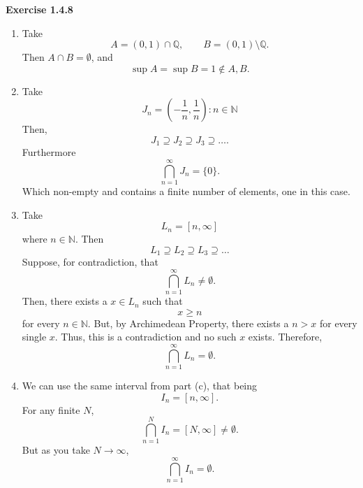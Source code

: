 \documentclass[12pt]{article}
\begin{document}
\noindent{} \textbf{Exercise 1.4.8}
\begin{enumerate}
    \item [(a)] Take
          \[
              A = (0,1) \cap \mathbb{Q}, \qquad B = (0,1) \setminus \mathbb{Q}.
          \]
          Then $A \cap B = \emptyset$, and
          \[
              \sup A = \sup B = 1 \notin A, B.
          \]
    \item [(b)] Take
          \[
              J_n = \left(-\frac{1}{n}, \frac{1}{n}\right) : n \in \mathbb{N}
          \]
          Then,
          \[
              J_1 \supseteq J_2 \supseteq J_3 \supseteq \ldots.
          \]
          Furthermore
          \[
              \bigcap_{n=1}^{\infty} J_n = \{0\}.
          \]
          Which non-empty and contains a finite number of elements, one in this case.
    \item [(c)]
          Take
          \[
              L_n = [n, \infty]
          \]
          where $n \in \mathbb{N}$.
          Then
          \[
              L_1 \supseteq L_2 \supseteq L_3 \supseteq \ldots
          \]
          Suppose, for contradiction, that
          \[
              \bigcap^{\infty}_{n=1} L_n \neq \emptyset.
          \]
          Then, there exists a $x \in L_n$ such that
          \[
              x \geq n
          \] for every $n \in \mathbb{N}$.
          But, by Archimedean Property, there exists a $n > x$ for every single $x$.
          Thus, this is a contradiction and no such $x$ exists.
          Therefore,
          \[
              \bigcap^{\infty}_{n=1} L_n = \emptyset.
          \]
    \item [(d)]
          We can use the same interval from part (c), that being
          \[
              I_n = [n, \infty].
          \]
          For any finite $N$,
          \[
              \bigcap_{n=1}^N I_n = [N, \infty] \neq \emptyset.
          \]
          But as you take $N \to \infty$,
          \[
              \bigcap_{n=1}^{\infty} I_n = \emptyset.
          \]

\end{enumerate}
\end{document}
